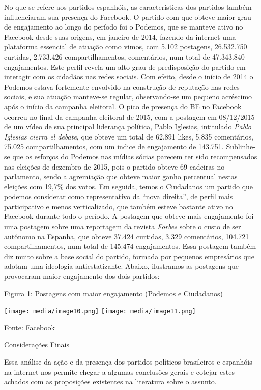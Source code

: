 No que se refere aos partidos espanhóis, as características dos partidos
também influenciaram sua presença do Facebook. O partido com que obteve
maior grau de engajamento ao longo do período foi o Podemos, que se
manteve ativo no Facebook desde suas origens, em janeiro de 2014,
fazendo da internet uma plataforma essencial de atuação como vimos, com
5.102 postagens, 26.532.750 curtidas, 2.733.426 compartilhamentos,
comentários, num total de 47.343.840 engajamentos. Este perfil revela um
alto grau de predisposição do partido em interagir com os cidadãos nas
redes sociais. Com efeito, desde o início de 2014 o Podemos estava
fortemente envolvido na construção de reputação nas redes sociais, e sua
atuação manteve-se regular, observando-se um pequeno acréscimo após o
início da campanha eleitoral. O pico de presença do BE no Facebook
ocorreu no final da campanha eleitoral de 2015, com a postagem em
08/12/2015 de um vídeo de sua principal liderança política, Pablo
Iglesias, intitulado \emph{Pablo Iglesias cierra el debate}, que obteve
um total de 62.891 likes, 5.835 comentários, 75.025 compartilhamentos,
com um indice de engajamento de 143.751. Sublinhe-se que os esforços do
Podemos nas mídias sócias parecem ter sido recompensados nas eleições de
dezembro de 2015, pois o partido obteve 69 cadeiras no parlamento, sendo
a agremiação que obteve maior ganho percentual nestas eleições com
19,7\% dos votos. Em seguida, temos o Ciudadanos um partido que podemos
considerar como representativo da ``nova direita'', de perfil mais
participativo e menos verticalizado, que também esteve bastante ativo no
Facebook durante todo o período. A postagem que obteve mais engajamento
foi uma postagem sobre uma reportagem da revista \emph{Forbes} sobre o
custo de ser autônomo na Espanha, que obteve 37.424 curtidas, 3.329
comentários, 104.721 compartilhamentos, num total de 145.474
engajamentos. Essa postagem também diz muito sobre a base social do
partido, formada por pequenos empresários que adotam uma ideologia
antiestatizante. Abaixo, ilustramos as postagens que provocaram maior
engajamento dos dois partidos:

Figura 1: Postagens com maior engajamento (Podemos e Ciudadanos)

\texttt{[image: media/image10.png]}
\texttt{[image: media/image11.png]}

Fonte: Facebook

Considerações Finais

Essa análise da ação e da presença dos partidos políticos brasileiros e
espanhóis na internet nos permite chegar a algumas conclusões gerais e
cotejar estes achados com as proposições existentes na literatura sobre
o assunto.

